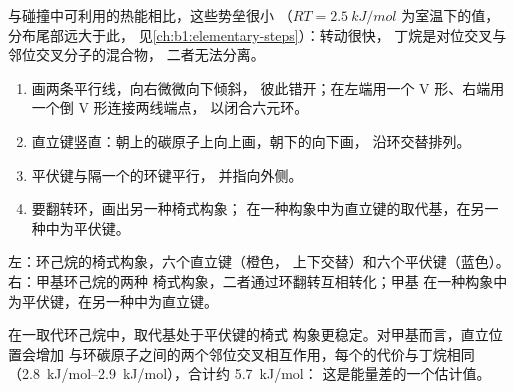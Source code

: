 与碰撞中可利用的热能相比，这些势垒很小
（$RT = \qty{2.5}{kJ/mol}$ 为室温下的值，分布尾部远大于此，
见\cref{ch:b1:elementary-steps}）：转动很快，
丁烷是对位交叉与邻位交叉分子的混合物，
二者无法分离。

\begin{method}[画椅式构象]\label{met:b1:stereochemistry-in-depth:draw-chair}
\begin{enumerate}
  \item 画两条平行线，向右微微向下倾斜，
        彼此错开；在左端用一个 V 形、右端用一个倒 V 形连接两线端点，
        以闭合六元环。
  \item 直立键竖直：朝上的碳原子上向上画，朝下的向下画，
        沿环交替排列。
  \item 平伏键与隔一个的环键平行，
        并指向外侧。
  \item 要翻转环，画出另一种椅式构象；
        在一种构象中为直立键的取代基，在另一种中为平伏键。
\end{enumerate}
\end{method}

\begin{omfigure}

{\small 左：环己烷的椅式构象，六个直立键（橙色，
上下交替）和六个平伏键（蓝色）。右：甲基环己烷的两种
椅式构象，二者通过环翻转互相转化；甲基
在一种构象中为平伏键，在另一种中为直立键。}
\end{omfigure}

\begin{proposition}[平伏取代基更稳定]\label{prop:b1:stereochemistry-in-depth:chair-substituent}
在一取代环己烷中，取代基处于平伏键的椅式
构象更稳定。对甲基而言，直立位置会增加
与环碳原子之间的两个邻位交叉相互作用，每个的代价与丁烷相同
（\qtyrange{2.8}{2.9}{kJ/mol}），合计约 \qty{5.7}{kJ/mol}：
这是能量差的一个估计值。
\end{proposition}

